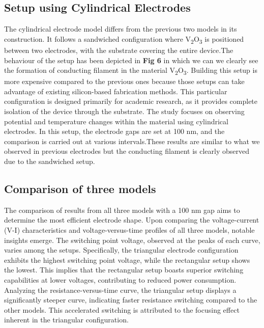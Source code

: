 \documentclass[conference]{IEEEtran}
\begin{document}
\subsection{Setup using Cylindrical Electrodes}


The cylindrical electrode model differs from the previous two models in its construction. It follows a sandwiched configuration where V\textsubscript{2}O\textsubscript{3} is positioned between two electrodes, with the substrate covering the entire device.The behaviour of the setup has been depicted in \textbf{Fig 6} in which we can we clearly see the formation of conducting filament in the material V\textsubscript{2}O\textsubscript{3}. Building this setup is more expensive compared to the previous ones because those setups can take advantage of existing silicon-based fabrication methods. This particular configuration is designed primarily for academic research, as it provides complete isolation of the device through the substrate. The study focuses on observing potential and temperature changes within the material using cylindrical electrodes. In this setup, the electrode gaps are set at 100 nm, and the comparison is carried out at various intervals.These results are similar to what we observed in previous electrodes but the conducting filament is clearly observed due to the sandwiched setup.




\subsection{Comparison of three models}

The comparison of results from all three models with a 100 nm gap aims to determine the most efficient electrode shape. Upon comparing the voltage-current (V-I) characteristics and voltage-versus-time profiles of all three models, notable insights emerge. The switching point voltage, observed at the peaks of each curve, varies among the setups. Specifically, the triangular electrode configuration exhibits the highest switching point voltage, while the rectangular setup shows the lowest. This implies that the rectangular setup boasts superior switching capabilities at lower voltages, contributing to reduced power consumption. Analyzing the resistance-versus-time curve, the triangular setup displays a significantly steeper curve, indicating faster resistance switching compared to the other models. This accelerated switching is attributed to the focusing effect inherent in the triangular configuration.
\end{document}
